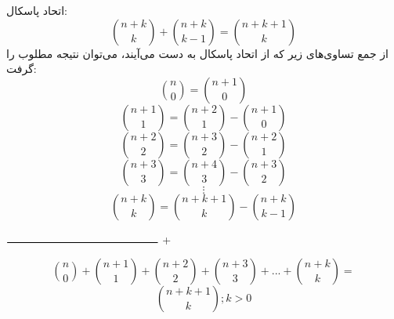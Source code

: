 \p
     اتحاد پاسکال:
     \[\binom{n+k}{k}+\binom{n+k}{k-1} = \binom{n+k+1}{k}\]
    از جمع تساوی‌های زیر که از اتحاد پاسکال به دست می‌آیند، می‌توان نتیجه مطلوب را گرفت:
    \[\binom{n}{0} = \binom{n+1}{0}\]
    \[\binom{n+1}{1} = \binom{n+2}{1}-\binom{n+1}{0}\]
    \[\binom{n+2}{2} = \binom{n+3}{2}-\binom{n+2}{1}\]
    \[\binom{n+3}{3} = \binom{n+4}{3}-\binom{n+3}{2}\]
    $$\vdots$$
    \[\binom{n+k}{k} = \binom{n+k+1}{k}-\binom{n+k}{k-1}\]
    \begin{center}
				$\rule{0.4\textwidth}{0.8pt}$
				\Huge{+}
	\end{center}
    $$\binom{n}{0}+\binom{n+1}{1}+\binom{n+2}{2}+\binom{n+3}{3}+...+\binom{n+k}{k} =$$
     $$\binom{n+k+1}{k}; k>0$$
